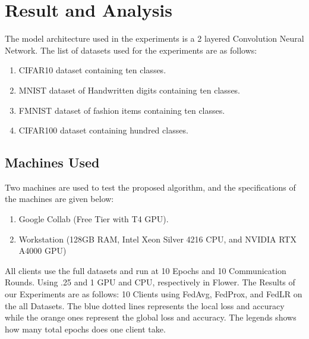 \documentclass[conference]{IEEEtran}
\begin{document}
\section{Result and Analysis}
The model architecture used in the experiments is a 2 layered Convolution Neural Network. The list of datasets used for the experiments are as follows:
\begin{enumerate}
    \item CIFAR10 \cite{cifar10} dataset containing ten classes.
    \item MNIST \cite{lecun1998mnist} dataset of Handwritten digits containing ten classes. 
    \item FMNIST \cite{xiao2017fashionmnistnovelimagedataset} dataset of fashion items containing ten classes.
    \item CIFAR100 \cite{Krizhevsky09learningmultiple} dataset containing hundred classes. 
\end{enumerate}
\subsection{Machines Used}
Two machines are used to test the proposed algorithm, and the specifications of the machines are given below:
\begin{enumerate}
	\item Google Collab (Free Tier with T4 GPU).
	\item Workstation (128GB RAM, Intel Xeon Silver 4216 CPU, and NVIDIA RTX A4000 GPU)
\end{enumerate}

All clients use the full datasets and run at 10 Epochs and 10 Communication Rounds. Using .25 and 1 GPU and CPU, respectively in Flower. The Results of our Experiments are as follows:
10 Clients using FedAvg, FedProx, and FedLR on the all Datasets. The blue dotted lines represents the local loss and accuracy while the orange ones represent the global loss and accuracy. The legends shows how many total epochs does one client take.
\end{document}
